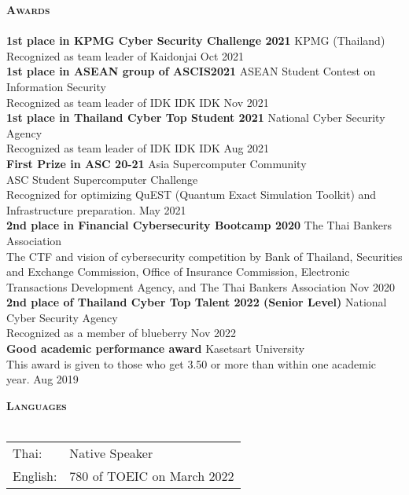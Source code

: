 \documentclass[a4paper]{article}
\newcommand{\lineunder} {
    \vspace*{-8pt} \\
    \hspace*{-18pt} \hrulefill \\
}
\newcommand{\header} [1] {
    {\hspace*{-18pt}\vspace*{6pt} \textsc{\textbf{#1}}}
    \vspace*{-6pt} \lineunder
}
\begin{document}
\header{Awards}
\textbf{1st place in KPMG Cyber Security Challenge 2021} \hfill KPMG (Thailand)\\
Recognized as team leader of Kaidonjai \hfill Oct 2021\\
\vspace*{2mm}
\textbf{1st place in ASEAN group of ASCIS2021} \hfill ASEAN Student Contest on Information Security\\
Recognized as team leader of IDK IDK IDK \hfill Nov 2021\\
\vspace*{2mm}
\textbf{1st place in Thailand Cyber Top Student 2021} \hfill National Cyber Security Agency\\
Recognized as team leader of IDK IDK IDK \hfill Aug 2021\\
\vspace*{2mm}
\textbf{First Prize in ASC 20-21} \hfill Asia Supercomputer Community\\
ASC Student Supercomputer Challenge\\
Recognized for optimizing QuEST (Quantum Exact Simulation Toolkit) and Infrastructure preparation. \hfill May 2021\\
\vspace*{2mm}
\textbf{2nd place in Financial Cybersecurity Bootcamp 2020} \hfill The Thai Bankers\textquotesingle{} Association\\
The CTF and vision of cybersecurity competition by Bank of Thailand, Securities and Exchange Commission, Office of Insurance Commission, Electronic Transactions Development Agency, and The Thai Bankers\textquotesingle{} Association \hfill Nov 2020\\
\vspace*{2mm}
\textbf{2nd place of Thailand Cyber Top Talent 2022 (Senior Level)} \hfill National Cyber Security Agency\\
Recognized as a member of blueberry \hfill Nov 2022\\
\vspace*{2mm}
\textbf{Good academic performance award} \hfill Kasetsart University\\
This award is given to those who get 3.50 or more than within one academic year. \hfill Aug 2019\\
\vspace*{2mm}


\header{Languages}
\begin{tabular}{ l l }
	Thai: & Native Speaker\\
	English:            & 780 of TOEIC on March 2022\\
\end{tabular}
\vspace{2mm}
\end{document}
